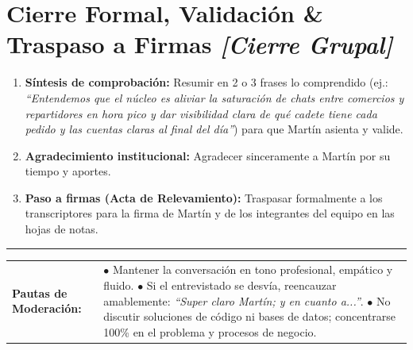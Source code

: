 \documentclass[11pt,a4paper]{article}
\begin{document}
\section*{Cierre Formal, Validación \& Traspaso a Firmas \hfill \normalfont\small\itshape [Cierre Grupal]}
\begin{enumerate}[label=\textbf{\arabic*.}]
  \item \textbf{Síntesis de comprobación:} Resumir en 2 o 3 frases lo comprendido (ej.: \textit{``Entendemos que el núcleo es aliviar la saturación de chats entre comercios y repartidores en hora pico y dar visibilidad clara de qué cadete tiene cada pedido y las cuentas claras al final del día''}) para que Martín asienta y valide.
  \item \textbf{Agradecimiento institucional:} Agradecer sinceramente a Martín por su tiempo y aportes.
  \item \textbf{Paso a firmas (Acta de Relevamiento):} Traspasar formalmente a los transcriptores para la firma de Martín y de los integrantes del equipo en las hojas de notas.
\end{enumerate}

\vspace{8pt}
\hrule
\vspace{5pt}

\noindent
\begin{tabularx}{\textwidth}{@{}l X@{}}
\small\textbf{Pautas de Moderación:} & 
\small
$\bullet$ Mantener la conversación en tono profesional, empático y fluido. \quad
$\bullet$ Si el entrevistado se desvía, reencauzar amablemente: \textit{``Super claro Martín; y en cuanto a...''}. \quad
$\bullet$ No discutir soluciones de código ni bases de datos; concentrarse 100\% en el problema y procesos de negocio.
\end{tabularx}
\end{document}
